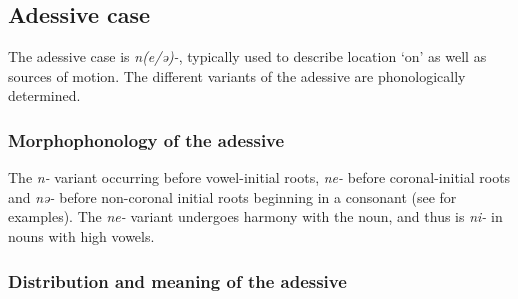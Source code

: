 \subsection{Adessive case}\label{sec:ch6:adessive}

The adessive case is \textit{n(e/ə)-}, typically used to describe location `on' as well as sources of motion. The different variants of the adessive are phonologically determined.

\subsubsection{Morphophonology of the adessive}

The \textit{n-} variant occurring before vowel-initial roots, \textit{ne-} before coronal-initial roots and \textit{nə-} before non-coronal initial roots beginning in a consonant (see  for examples). The \textit{ne-} variant undergoes harmony with the noun, and thus is \textit{ni-} in nouns with high vowels.

\subsubsection{Distribution and meaning of the adessive}

